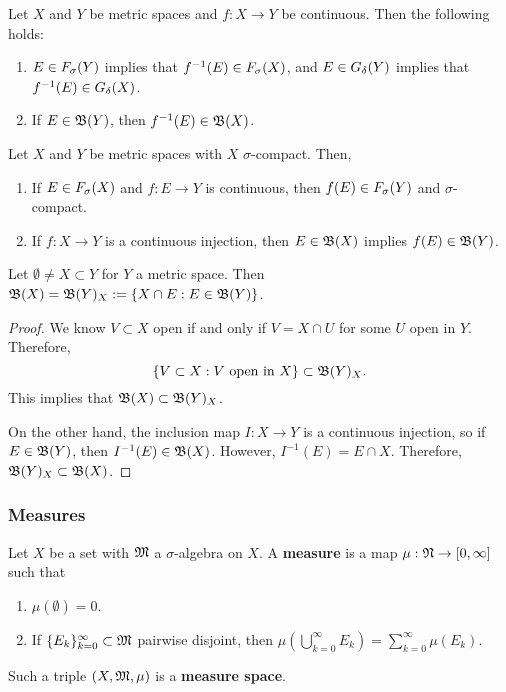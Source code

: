 \documentclass[a4paper]{article}
\renewcommand{\cupinfk}{\bigcup_{k=0}^\infty}
\renewcommand{\suminfk}{\sum_{k=0}^\infty}
\renewcommand{\seqinfk}[1]{\{ #1 \}_{k=0}^\infty}
\begin{document}
\begin{thm}
  Let $X$ and $Y$ be metric spaces and $f: X \to Y$ be
  continuous. Then the following holds:
  \begin{enumerate}
    \item $E \in F_\sigma(Y)$ implies that $f^{-1}(E) \in F_\sigma(X)$,
    and $E \in G_\delta(Y)$ implies that $f^{-1}(E) \in G_\delta(X)$.

    \item If $E \in \mathfrak{B}(Y)$, then $f^{-1}(E) \in \mathfrak{B}(X)$.
  \end{enumerate}
\end{thm}

\begin{thm}
  Let $X$ and $Y$ be metric spaces with $X$ $\sigma$-compact.
  Then,
  \begin{enumerate}
    \item If $E \in F_\sigma(X)$ and $f : E \to Y$ is continuous,
    then $f(E) \in F_\sigma(Y)$ and $\sigma$-compact.

    \item If $f: X \to Y$ is a continuous injection,
    then $E \in \mathfrak{B}(X)$ implies $f(E) \in \mathfrak{B}(Y)$.
  \end{enumerate}
\end{thm}

\begin{cor}
  Let $\emptyset \neq X \subset Y$ for $Y$ a metric space.
  Then $\mathfrak{B}(X) = \mathfrak{B}(Y)_X := \left\{ X \cap E: E \in
  \mathfrak{B}(Y) \right\}$.
\end{cor}

\begin{proof}
  We know $V \subset X$ open if and only if $V = X \cap U$
  for some $U$ open in $Y$.
  Therefore,
  \[
    \left\{ V \subset X: \text{$V$ open in $X$}
    \right\} \subset \mathfrak{B}(Y)_X.
  \]
  This implies that $\mathfrak{B}(X) \subset \mathfrak{B}(Y)_X$.

  On the other hand, the inclusion map $I: X \to Y$ is
  a continuous injection, so if $E \in \mathfrak{B}(Y)$, then
  $I^{-1}(E) \in \mathfrak{B}(X)$. However, $I^{-1}(E) = E \cap X$.
  Therefore, $\mathfrak{B}(Y)_X \subset \mathfrak{B}(X)$.

\end{proof}

\subsubsection{Measures}

\begin{defi}[Measure]
  Let $X$ be a set with $\mathfrak{M}$ a $\sigma$-algebra on $X$.
  A \textbf{measure} is a map $\mu: \mathfrak{N} \to [0, \infty]$
  such that
  \begin{enumerate}
    \item $\mu(\emptyset) = 0$.
    \item If $\seqinfk{E_k} \subset \mf$ pairwise disjoint,
    then $\mu \left( \cupinfk E_k \right) = \suminfk \mu (E_k)$.
  \end{enumerate}
  Such a triple $(X, \mathfrak{M}, \mu)$ is a \textbf{measure
  space}.
\end{defi}
\end{document}
